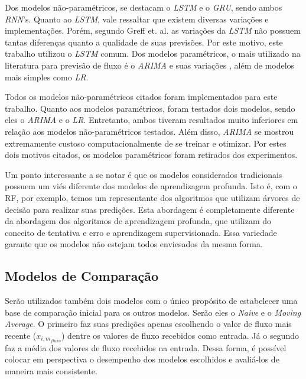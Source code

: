 Dos modelos não-paramétricos, se destacam o \textit{\acrfull{LSTM}} e o \textit{\acrfull{GRU}}, sendo ambos \textit{\acrshort{RNN}}'s. Quanto ao \textit{\acrfull{LSTM}}, vale ressaltar que existem diversas variações e implementações. Porém, segundo Greff et. al. \cite{Greff_2015} as variações da \textit{\acrshort{LSTM}} não possuem tantas diferenças quanto a qualidade de suas previsões. Por este motivo, este trabalho utilizou o \textit{\acrfull{LSTM}} comum. Dos modelos paramétricos, o mais utilizado na literatura para previsão de fluxo é o \textit{\acrfull{ARIMA}} e suas variações \cite{doi:10.1080/01441647.2014.992496}, além de modelos mais simples como \textit{\acrfull{LR}}. 

Todos os modelos não-paramétricos citados foram implementados para este trabalho. Quanto aos modelos paramétricos, foram testados dois modelos, sendo eles o \textit{\acrshort{ARIMA}} e o \textit{\acrshort{LR}}. Entretanto, ambos tiveram resultados muito inferiores em relação aos modelos não-paramétricos testados. Além disso, \textit{\acrshort{ARIMA}} se mostrou extremamente custoso computacionalmente de se treinar e otimizar. Por estes dois motivos citados, os modelos paramétricos foram retirados dos experimentos.

Um ponto interessante a se notar é que os modelos considerados tradicionais possuem um viés diferente dos modelos de aprendizagem profunda. Isto é, com o \acrshort{RF}, por exemplo, temos um representante dos algoritmos que utilizam árvores de decisão para realizar suas predições. Esta abordagem é completamente diferente da abordagem dos algoritmos de aprendizagem profunda, que utilizam do conceito de tentativa e erro e aprendizagem supervisionada. Essa variedade garante que os modelos não estejam todos enviesados da mesma forma.



\subsection{Modelos de Comparação}

Serão utilizados também dois modelos com o único propósito de estabelecer uma base de comparação inicial para os outros modelos. Serão eles o \textit{Naive} e o \textit{Moving Average}. O primeiro faz suas predições apenas escolhendo o valor de fluxo mais recente (\(x_{i, m_{fluxo}}\)) dentre os valores de fluxo recebidos como entrada. Já o segundo faz a média dos valores de fluxo recebidos na entrada. Dessa forma, é possível colocar em perspectiva o desempenho dos modelos escolhidos e avaliá-los de maneira mais consistente.

